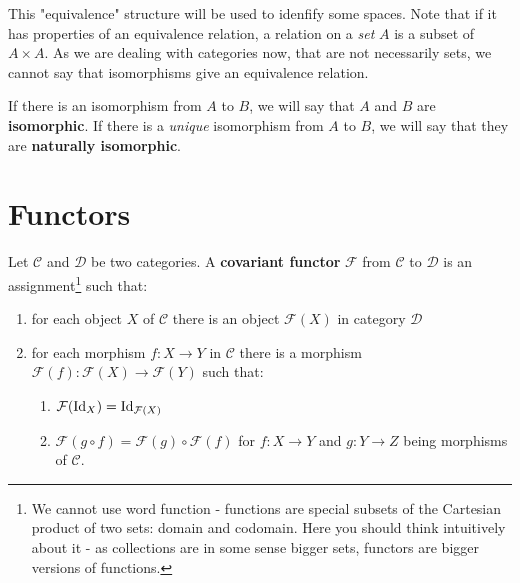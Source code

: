 This "equivalence" structure will be used to idenfify some spaces. Note that if it has properties of an equivalence relation, a relation on a \emph{set} $A$ is a subset of $A\times A$. As we are
dealing with categories now, that are not necessarily sets, we cannot say that isomorphisms give an equivalence relation.

\begin{definition}
  If there is an isomorphism from $A$ to $B$, we will say that $A$ and $B$ are \textbf{isomorphic}. If there is a \emph{unique} isomorphism from $A$ to $B$, we will say that they are \textbf{naturally isomorphic}.
\end{definition}

\section{Functors}
\begin{definition}
    Let $\mathcal C$ and $\mathcal D$ be two categories. A \textbf{covariant functor} $\mathcal F$ from $\mathcal C$ to $\mathcal D$ is an assignment\footnote{We cannot use word function - functions are special subsets of the Cartesian product of two sets: domain and codomain. Here you should think intuitively about it - as collections are in some sense bigger sets, functors are bigger versions of functions.} such that:
    \begin{enumerate}
      \item for each object $X$ of $\mathcal C$ there is an object $\mathcal F(X)$ in category $\mathcal D$
      \item for each morphism $f: X\to Y$ in $\mathcal C$ there is a morphism $\mathcal F(f):\mathcal F(X)\to \mathcal F(Y)$ such that:
        \begin{enumerate}
          \item $\mathcal F(\text{Id}_X)=\text{Id}_{\mathcal F(X)}$
          \item $\mathcal F(g\circ f) = \mathcal F(g)\circ \mathcal F(f)$ for $f:X\to Y$ and $g:Y\to Z$ being morphisms of $\mathcal C$.
        \end{enumerate}
    \end{enumerate}
\end{definition}
